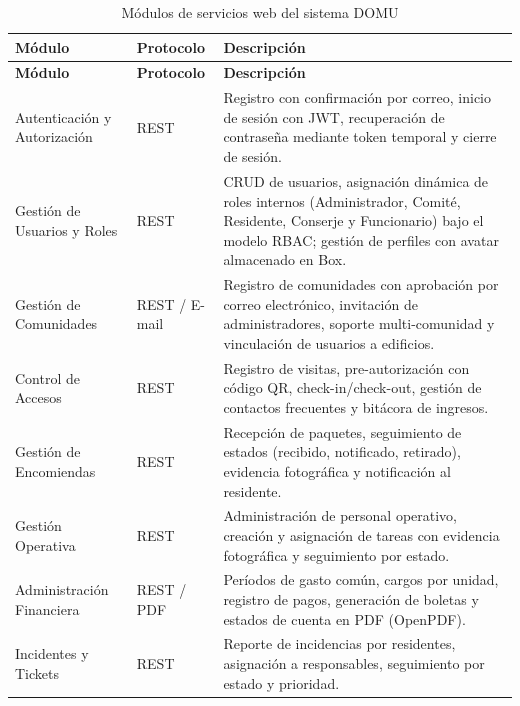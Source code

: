 \begin{longtable}{|p{}|p{}|p{}|}
\caption{Módulos de servicios web del sistema DOMU}\label{tab:servicios-web}\\
\hline
\textbf{Módulo} & \textbf{Protocolo} & \textbf{Descripción} \\
\hline
\endfirsthead
\hline
\textbf{Módulo} & \textbf{Protocolo} & \textbf{Descripción} \\
\hline
\endhead
\hline
\endfoot

Autenticación y Autorización &
REST &
Registro con confirmación por correo, inicio de sesión con JWT, recuperación de contraseña mediante token temporal y cierre de sesión. \\
\hline

Gestión de Usuarios y Roles &
REST &
CRUD de usuarios, asignación dinámica de roles internos (Administrador, Comité, Residente, Conserje y Funcionario) bajo el modelo RBAC; gestión de perfiles con avatar almacenado en Box. \\
\hline

Gestión de Comunidades &
REST / E-mail &
Registro de comunidades con aprobación por correo electrónico, invitación de administradores, soporte multi-comunidad y vinculación de usuarios a edificios. \\
\hline

Control de Accesos &
REST &
Registro de visitas, pre-autorización con código QR, check-in/check-out, gestión de contactos frecuentes y bitácora de ingresos. \\
\hline

Gestión de Encomiendas &
REST &
Recepción de paquetes, seguimiento de estados (recibido, notificado, retirado), evidencia fotográfica y notificación al residente. \\
\hline

Gestión Operativa &
REST &
Administración de personal operativo, creación y asignación de tareas con evidencia fotográfica y seguimiento por estado. \\
\hline

Administración Financiera &
REST / PDF &
Períodos de gasto común, cargos por unidad, registro de pagos, generación de boletas y estados de cuenta en PDF (OpenPDF). \\
\hline

Incidentes y Tickets &
REST &
Reporte de incidencias por residentes, asignación a responsables, seguimiento por estado y prioridad. \\
\hline


\end{longtable}

